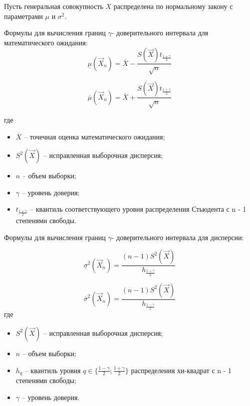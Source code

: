 Пусть генеральная совокупность $X$ распределена по нормальному закону с параметрами $\mu$ и $\sigma^2$.

Формулы для вычисления границ $\gamma$- доверительного интервала для математического ожидания:
$$
\underline\mu(\vec X_n)=\overline X - \frac{S(\vec X)t_{\frac{1+\gamma}{2}}}{\sqrt{n}}
$$

$$
\overline\mu(\vec X_n)=\overline X + \frac{S(\vec X)t_{\frac{1+\gamma}{2}}}{\sqrt{n}}
$$

где
\begin{itemize}
    \item $\overline X$ -- точечная оценка математического ожидания;

    \item $S^2(\vec X)$ -- исправленная выборочная дисперсия;

    \item $n$ -- объем выборки;

    \item $\gamma$ -- уровень доверия;

    \item $t_{\frac{1+\gamma}{2}}$ -- квантиль соответствующего уровня распределения Стьюдента с n - 1 степенями свободы.
\end{itemize}

Формулы для вычисления границ $\gamma$- доверительного интервала для дисперсии:

$$
\underline\sigma^2(\vec X_n)= \frac{(n-1)S^2(\vec X)}{h_{\frac{1+\gamma}{2}}}
$$

$$
\overline\sigma^2(\vec X_n)= \frac{(n-1)S^2(\vec X)}{h_{\frac{1-\gamma}{2}}}
$$
где
\begin{itemize}
    \item $S^2(\vec X)$ -- исправленная выборочная дисперсия;

    \item $n$ -- объем выборки;


    \item $h_q$ -- квантиль уровня $q \in{\big\{ {\frac{1-\gamma}{2}}; {\frac{1+\gamma}{2}}}\big\}$ распределения хи-квадрат с n - 1 степенями свободы;
    \item $\gamma$ -- уровень доверия.
        
\end{itemize}

